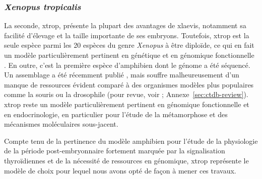 \documentclass[../main.tex]{subfiles}
\begin{document}
\subsubsection{\textit{Xenopus tropicalis}}
La seconde, \gls{xtrop}, présente la plupart des avantages de \gls{xlaevis}, notamment sa facilité d'élevage et la taille importante de ses embryons.
Toutefois, \gls{xtrop} est la seule espèce parmi les 20 espèces du genre \textit{Xenopus} à être diploïde, ce qui en fait un modèle particulièrement pertinent en génétique et en génomique fonctionnelle \citep{Amaya2005}.
En outre, c'est la première espèce d'amphibien dont le génome a été séquencé.
Un assemblage a été récemment publié \citep{Hellsten2010a}, mais souffre malheureusement d'un manque de ressources évident comparé à des organismes modèles plus populaires comme la souris ou la drosophile (pour revue, voir \citet{Grimaldi2013}; Annexe~\ref{sec:ctdb-review}).
\gls{xtrop} reste un modèle particulièrement pertinent en génomique fonctionnelle et en endocrinologie, en particulier pour l'étude de la métamorphose et des mécanismes moléculaires sous-jacent.
\par
Compte tenu de la pertinence du modèle amphibien pour l'étude de la physiologie de la période post-embryonnaire fortement marquée par la signalisation thyroïdiennes et de la nécessité de ressources en génomique, \gls{xtrop} représente le modèle de choix pour lequel nous avons opté de façon à mener ces travaux.

\end{document}
